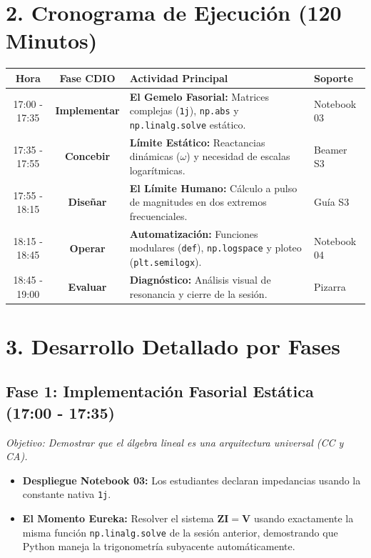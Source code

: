 \documentclass[11pt,a4paper]{article}
\begin{document}
\section*{2. Cronograma de Ejecución (120 Minutos)}
\begin{table}[h!]
    \centering
    \renewcommand{\arraystretch}{1.3}
    \begin{tabularx}{\textwidth}{@{} c c X l @{}}
        \toprule
        \textbf{Hora} & \textbf{Fase CDIO} & \textbf{Actividad Principal} & \textbf{Soporte} \\
        \midrule
        17:00 - 17:35 & \textbf{Implementar} & \textbf{El Gemelo Fasorial:} Matrices complejas (\texttt{1j}), \texttt{np.abs} y \texttt{np.linalg.solve} estático. & Notebook 03 \\
        17:35 - 17:55 & \textbf{Concebir} & \textbf{Límite Estático:} Reactancias dinámicas ($\omega$) y necesidad de escalas logarítmicas. & Beamer S3 \\
        17:55 - 18:15 & \textbf{Diseñar} & \textbf{El Límite Humano:} Cálculo a pulso de magnitudes en dos extremos frecuenciales. & Guía S3 \\
        18:15 - 18:45 & \textbf{Operar} & \textbf{Automatización:} Funciones modulares (\texttt{def}), \texttt{np.logspace} y ploteo (\texttt{plt.semilogx}). & Notebook 04 \\
        18:45 - 19:00 & \textbf{Evaluar} & \textbf{Diagnóstico:} Análisis visual de resonancia y cierre de la sesión. & Pizarra \\
        \bottomrule
    \end{tabularx}
\end{table}

\section*{3. Desarrollo Detallado por Fases}

\subsection*{Fase 1: Implementación Fasorial Estática (17:00 - 17:35)}
\textit{Objetivo: Demostrar que el álgebra lineal es una arquitectura universal (CC y CA).}
\begin{itemize}
    \item \textbf{Despliegue Notebook 03:} Los estudiantes declaran impedancias usando la constante nativa \texttt{1j}.
    \item \textbf{El Momento Eureka:} Resolver el sistema $\mathbf{Z}\mathbf{I} = \mathbf{V}$ usando exactamente la misma función \texttt{np.linalg.solve} de la sesión anterior, demostrando que Python maneja la trigonometría subyacente automáticamente.
\end{itemize}
\end{document}
